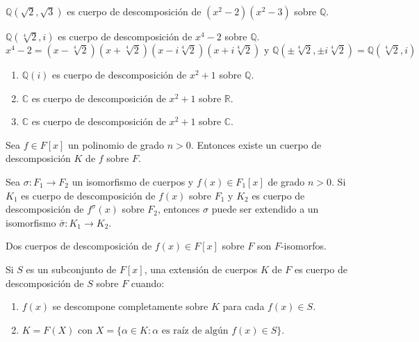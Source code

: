 \begin{example}
    $\mathbb{Q}(\sqrt{2}, \sqrt{3})$ es cuerpo de descomposición de $(x^2-2)(x^2-3)$ sobre $\mathbb{Q}$.
\end{example}

\begin{example}
    $\mathbb{Q}(\sqrt[4]{2}, i)$ es cuerpo de descomposición de $x^4-2$ sobre $\mathbb{Q}$.
    $$x^4-2 = (x - \sqrt[4]{2})(x + \sqrt[4]{2})(x - i\sqrt[4]{2})(x + i\sqrt[4]{2}) \text{ y } \mathbb{Q}(\pm \sqrt[4]{2}, \pm i\sqrt[4]{2}) = \mathbb{Q}(\sqrt[4]{2}, i)$$
\end{example}

\begin{example}
    \begin{enumerate}
        \item $\mathbb{Q}(i)$ es cuerpo de descomposición de $x^2+1$ sobre $\mathbb{Q}$.
        \item $\mathbb{C}$ es cuerpo de descomposición de $x^2+1$ sobre $\mathbb{R}$.
        \item $\mathbb{C}$ es cuerpo de descomposición de $x^2+1$ sobre $\mathbb{C}$.
    \end{enumerate}
\end{example}

\begin{theorem}
    Sea $f \in F[x]$ un polinomio de grado $n > 0$.
    Entonces existe un cuerpo de descomposición $K$ de $f$ sobre $F$.
\end{theorem}

\begin{theorem}
    Sea $\sigma : F_1 \to F_2$ un isomorfismo de cuerpos y $f(x) \in F_1[x]$ de grado $n > 0$.
    Si $K_1$ es cuerpo de descomposición de $f(x)$ sobre $F_1$ y $K_2$ es cuerpo de descomposición de $f^\sigma(x)$ sobre $F_2$, entonces $\sigma$ puede ser extendido a un isomorfismo $\bar{\sigma} : K_1 \to K_2$.
\end{theorem}

\begin{corollary}
    Dos cuerpos de descomposición de $f(x) \in F[x]$ sobre $F$ son $F$-isomorfos.
\end{corollary}

\begin{definition}
    Si $S$ es un subconjunto de $F[x]$, una extensión de cuerpos $K$ de $F$ es cuerpo de descomposición de $S$ sobre $F$ cuando:
    \begin{enumerate}
        \item $f(x)$ se descompone completamente sobre $K$ para cada $f(x) \in S$.
        \item $K = F(X)$ con $X = \{ \alpha \in K : \alpha \text{ es raíz de algún } f(x) \in S \}$.
    \end{enumerate}
\end{definition}

